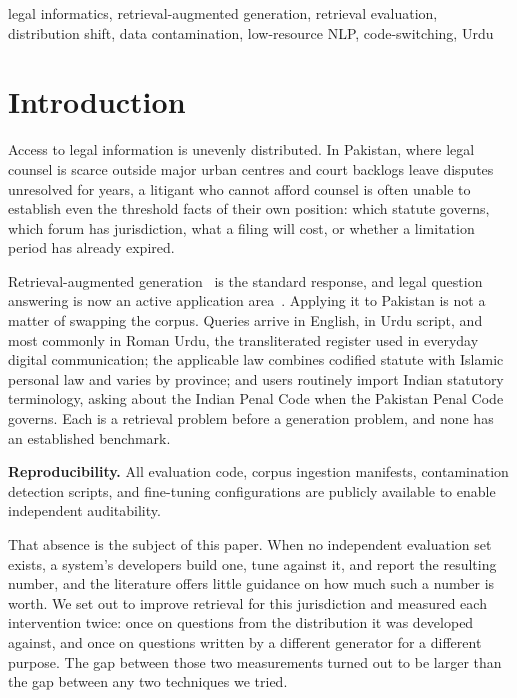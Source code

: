 \documentclass[conference]{IEEEtran}
\begin{document}
\begin{IEEEkeywords}
legal informatics, retrieval-augmented generation, retrieval evaluation,
distribution shift, data contamination, low-resource NLP, code-switching, Urdu
\end{IEEEkeywords}

\section{Introduction}
Access to legal information is unevenly distributed. In Pakistan, where
legal counsel is scarce outside major urban centres and court backlogs leave
disputes unresolved for years, a litigant who cannot afford counsel is often
unable to establish even the threshold facts of their own position: which statute
governs, which forum has jurisdiction, what a filing will cost, or whether a
limitation period has already expired.

Retrieval-augmented generation~\cite{lewis2020rag} is the standard response, and
legal question answering is now an active application
area~\cite{chalkidis2020legalbert,guha2023legalbench}. Applying it to Pakistan
is not a matter of swapping the corpus. Queries arrive in English, in Urdu
script, and most commonly in Roman Urdu, the transliterated register used in
everyday digital communication; the applicable law combines codified statute
with Islamic personal law and varies by province; and users routinely import
Indian statutory terminology, asking about the Indian Penal Code when the
Pakistan Penal Code governs. Each is a retrieval problem before a generation
problem, and none has an established benchmark.

\textbf{Reproducibility.} All evaluation code, corpus ingestion manifests,
contamination detection scripts, and fine-tuning configurations are publicly
available to enable independent auditability.

That absence is the subject of this paper. When no independent evaluation set
exists, a system's developers build one, tune against it, and report the
resulting number, and the literature offers little guidance on how much such
a number is worth. We set out to improve retrieval for this jurisdiction and
measured each intervention twice: once on questions from the distribution it was
developed against, and once on questions written by a different generator for a
different purpose. The gap between those two measurements turned out to be
larger than the gap between any two techniques we tried.
\end{document}
